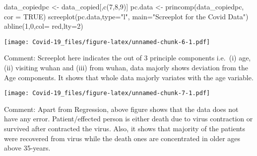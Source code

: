 \documentclass[
]{article}
\newenvironment{Shaded}{\begin{snugshade}}{\end{snugshade}}
\newcommand{\AttributeTok}[1]{\textcolor[rgb]{0.77,0.63,0.00}{#1}}
\newcommand{\CommentTok}[1]{\textcolor[rgb]{0.56,0.35,0.01}{\textit{#1}}}
\newcommand{\ConstantTok}[1]{\textcolor[rgb]{0.00,0.00,0.00}{#1}}
\newcommand{\DecValTok}[1]{\textcolor[rgb]{0.00,0.00,0.81}{#1}}
\newcommand{\FunctionTok}[1]{\textcolor[rgb]{0.00,0.00,0.00}{#1}}
\newcommand{\NormalTok}[1]{#1}
\newcommand{\OtherTok}[1]{\textcolor[rgb]{0.56,0.35,0.01}{#1}}
\newcommand{\SpecialCharTok}[1]{\textcolor[rgb]{0.00,0.00,0.00}{#1}}
\newcommand{\StringTok}[1]{\textcolor[rgb]{0.31,0.60,0.02}{#1}}
\begin{document}
\begin{Shaded}
\begin{Highlighting}[]
\NormalTok{data\_copiedpc }\OtherTok{\textless{}{-}}\NormalTok{ data\_copied[,}\FunctionTok{c}\NormalTok{(}\DecValTok{7}\NormalTok{,}\DecValTok{8}\NormalTok{,}\DecValTok{9}\NormalTok{)]}
\NormalTok{pc.data }\OtherTok{\textless{}{-}} \FunctionTok{princomp}\NormalTok{(data\_copiedpc, }\AttributeTok{cor =} \ConstantTok{TRUE}\NormalTok{)}
\FunctionTok{screeplot}\NormalTok{(pc.data,}\AttributeTok{type=}\StringTok{"l"}\NormalTok{, }\AttributeTok{main=}\StringTok{"Screeplot for the Covid Data"}\NormalTok{)}
\FunctionTok{abline}\NormalTok{(}\DecValTok{1}\NormalTok{,}\DecValTok{0}\NormalTok{,}\AttributeTok{col=} \StringTok{\textquotesingle{}red\textquotesingle{}}\NormalTok{,}\AttributeTok{lty=}\DecValTok{2}\NormalTok{)}
\end{Highlighting}
\end{Shaded}

\texttt{[image: Covid-19\_files/figure-latex/unnamed-chunk-6-1.pdf]}

Comment: Screeplot here indicates the out of 3 principle components
i.e.~(i) age, (ii) visiting wuhan and (iii) from wuhan, data majorly
shows deviation from the Age components. It shows that whole data
majorly variates with the age variable.

\begin{Shaded}
\end{Shaded}

\texttt{[image: Covid-19\_files/figure-latex/unnamed-chunk-7-1.pdf]}

Comment: Apart from Regression, above figure shows that the data does
not have any error. Patient/effected person is either death due to virus
contraction or survived after contracted the virus. Also, it shows that
majority of the patients were recovered from virus while the death ones
are concentrated in older ages above 35-years.
\end{document}
